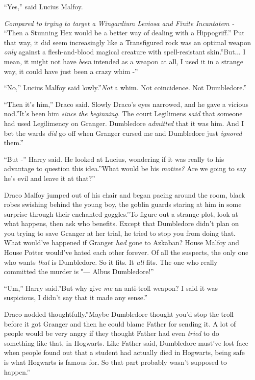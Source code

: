 ``Yes,'' said Lucius Malfoy.

\emph{Compared to trying to target a Wingardium Leviosa and Finite
Incantatem -} ``Then a Stunning Hex would be a better way of dealing
with a Hippogriff.'' Put that way, it did seem increasingly like a
Transfigured rock was an optimal weapon \emph{only} against a
flesh-and-blood magical creature with spell-resistant skin.''But...
I mean, it might not have \emph{been} intended as a weapon at all, I
used it in a strange way, it could have just been a crazy whim -''

``No,'' Lucius Malfoy said lowly.''\emph{Not} a whim. Not coincidence.
Not Dumbledore.''

``Then it's him,'' Draco said. Slowly Draco's eyes narrowed, and he gave
a vicious nod.''It's been him \emph{since the beginning.} The court
Legilimens \emph{said} that someone had used Legilimency on Granger.
Dumbledore \emph{admitted} that it was him. And I bet the wards
\emph{did} go off when Granger cursed me and Dumbledore just
\emph{ignored} them.''

``But -'' Harry said. He looked at Lucius, wondering if it was really to
his advantage to question this idea.''What would be his \emph{motive?}
Are we going to say he's evil and leave it at that?''

Draco Malfoy jumped out of his chair and began pacing around the room,
black robes swishing behind the young boy, the goblin guards staring at
him in some surprise through their enchanted goggles.''To figure out a
strange plot, look at what happens, then ask who benefits. Except that
Dumbledore didn't plan on you trying to save Granger at her trial, he
tried to stop you from doing that. What would've happened if Granger
\emph{had} gone to Azkaban? House Malfoy and House Potter would've hated
each other forever. Of all the suspects, the only one who wants
\emph{that} is Dumbledore. So it fits. It \emph{all} fits. The one who
really committed the murder is "--- Albus Dumbledore!''

``Um,'' Harry said.''But why give \emph{me} an anti-troll weapon? I said
it was suspicious, I didn't say that it made any sense.''

Draco nodded thoughtfully.''Maybe Dumbledore thought you'd stop the
troll before it got Granger and then he could blame Father for sending
it. A lot of people would be very angry if they thought Father had even
\emph{tried} to do something like that, in Hogwarts. Like Father said,
Dumbledore must've lost face when people found out that a student had
actually died in Hogwarts, being safe is what Hogwarts is famous for. So
that part probably wasn't supposed to happen.''

